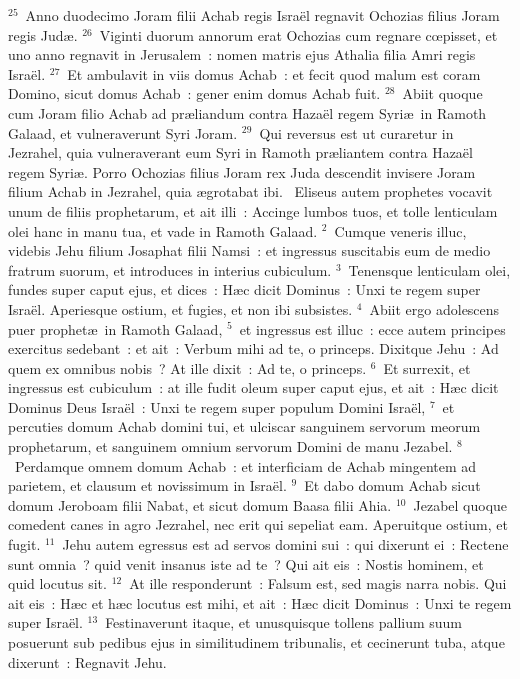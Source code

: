 ${}^{25}$~Anno duodecimo Joram filii Achab regis Isra\"el regnavit Ochozias filius Joram regis Jud\ae .
${}^{26}$~Viginti duorum annorum erat Ochozias cum regnare cœpisset, et uno anno regnavit in Jerusalem~: nomen matris ejus Athalia filia Amri regis Isra\"el.
${}^{27}$~Et ambulavit in viis domus Achab~: et fecit quod malum est coram Domino, sicut domus Achab~: gener enim domus Achab fuit.
${}^{28}$~Abiit quoque cum Joram filio Achab ad pr\ae liandum contra Haza\"el regem Syri\ae\ in Ramoth Galaad, et vulneraverunt Syri Joram.
${}^{29}$~Qui reversus est ut curaretur in Jezrahel, quia vulneraverant eum Syri in Ramoth pr\ae liantem contra Haza\"el regem Syri\ae . Porro Ochozias filius Joram rex Juda descendit invisere Joram filium Achab in Jezrahel, quia \ae grotabat ibi.
~Eliseus autem prophetes vocavit unum de filiis prophetarum, et ait illi~: Accinge lumbos tuos, et tolle lenticulam olei hanc in manu tua, et vade in Ramoth Galaad.
${}^{2}$~Cumque veneris illuc, videbis Jehu filium Josaphat filii Namsi~: et ingressus suscitabis eum de medio fratrum suorum, et introduces in interius cubiculum.
${}^{3}$~Tenensque lenticulam olei, fundes super caput ejus, et dices~: H\ae c dicit Dominus~: Unxi te regem super Isra\"el. Aperiesque ostium, et fugies, et non ibi subsistes.
${}^{4}$~Abiit ergo adolescens puer prophet\ae\ in Ramoth Galaad,
${}^{5}$~et ingressus est illuc~: ecce autem principes exercitus sedebant~: et ait~: Verbum mihi ad te, o princeps. Dixitque Jehu~: Ad quem ex omnibus nobis~? At ille dixit~: Ad te, o princeps.
${}^{6}$~Et surrexit, et ingressus est cubiculum~: at ille fudit oleum super caput ejus, et ait~: H\ae c dicit Dominus Deus Isra\"el~: Unxi te regem super populum Domini Isra\"el,
${}^{7}$~et percuties domum Achab domini tui, et ulciscar sanguinem servorum meorum prophetarum, et sanguinem omnium servorum Domini de manu Jezabel.
${}^{8}$~Perdamque omnem domum Achab~: et interficiam de Achab mingentem ad parietem, et clausum et novissimum in Isra\"el.
${}^{9}$~Et dabo domum Achab sicut domum Jeroboam filii Nabat, et sicut domum Baasa filii Ahia.
${}^{10}$~Jezabel quoque comedent canes in agro Jezrahel, nec erit qui sepeliat eam. Aperuitque ostium, et fugit.
${}^{11}$~Jehu autem egressus est ad servos domini sui~: qui dixerunt ei~: Rectene sunt omnia~? quid venit insanus iste ad te~? Qui ait eis~: Nostis hominem, et quid locutus sit.
${}^{12}$~At ille responderunt~: Falsum est, sed magis narra nobis. Qui ait eis~: H\ae c et h\ae c locutus est mihi, et ait~: H\ae c dicit Dominus~: Unxi te regem super Isra\"el.
${}^{13}$~Festinaverunt itaque, et unusquisque tollens pallium suum posuerunt sub pedibus ejus in similitudinem tribunalis, et cecinerunt tuba, atque dixerunt~: Regnavit Jehu.


